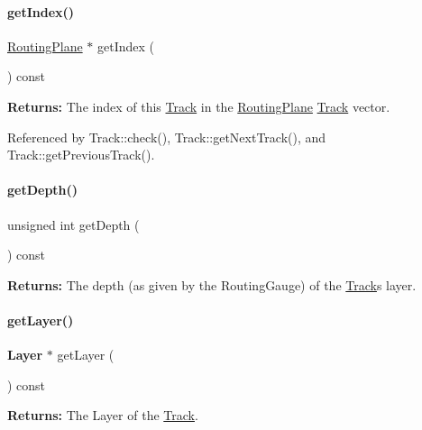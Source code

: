 \paragraph{\texorpdfstring{get\+Index()}{getIndex()}}
{\footnotesize\ttfamily \mbox{\hyperlink{classKite_1_1RoutingPlane}{Routing\+Plane}} $\ast$ get\+Index (\begin{DoxyParamCaption}{ }\end{DoxyParamCaption}) const\hspace{0.3cm}{\ttfamily [inline]}}

{\bfseries Returns\+:} The index of this \mbox{\hyperlink{classKite_1_1Track}{Track}} in the \mbox{\hyperlink{classKite_1_1RoutingPlane}{Routing\+Plane}} \mbox{\hyperlink{classKite_1_1Track}{Track}} vector. 

Referenced by Track\+::check(), Track\+::get\+Next\+Track(), and Track\+::get\+Previous\+Track().

\mbox{\label{classKite_1_1Track_a6c4d9081746b8daa3e45e5e3dd185b60}} 
\paragraph{\texorpdfstring{get\+Depth()}{getDepth()}}
{\footnotesize\ttfamily unsigned int get\+Depth (\begin{DoxyParamCaption}{ }\end{DoxyParamCaption}) const}

{\bfseries Returns\+:} The depth (as given by the Routing\+Gauge) of the \mbox{\hyperlink{classKite_1_1Track}{Track}}\textquotesingle{}s layer. \mbox{\label{classKite_1_1Track_ab468d5fc5ad722f437b81decc8209ab7}} 
\paragraph{\texorpdfstring{get\+Layer()}{getLayer()}}
{\footnotesize\ttfamily \textbf{ Layer} $\ast$ get\+Layer (\begin{DoxyParamCaption}{ }\end{DoxyParamCaption}) const}

{\bfseries Returns\+:} The {\ttfamily Layer} of the \mbox{\hyperlink{classKite_1_1Track}{Track}}. 

